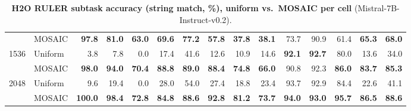 \begin{table}[tp]
\begin{tabular}{@{} c l rrrrrrrrrrrrr @{}}
     & MOSAIC & \textbf{97.8} & \textbf{81.0} & \textbf{63.0} & \textbf{69.6} & \textbf{77.2} & \textbf{57.8} & \textbf{37.8} & \textbf{38.1} & 73.7 & 90.9 & 61.4 & \textbf{65.3} & \textbf{68.0} \\
    \cmidrule(l){1-15}
    \multirow{2}{*}{1536} & Uniform & 3.8 & 7.8 & 0.0 & 17.4 & 41.6 & 12.6 & 10.9 & 14.6 & \textbf{92.1} & \textbf{92.7} & 80.0 & 13.6 & 34.0 \\
     & MOSAIC & \textbf{98.0} & \textbf{94.0} & \textbf{70.4} & \textbf{88.8} & \textbf{89.0} & \textbf{88.4} & \textbf{74.8} & \textbf{66.0} & 90.8 & 92.3 & \textbf{86.0} & \textbf{83.7} & \textbf{85.3} \\
    \cmidrule(l){1-15}
    \multirow{2}{*}{2048} & Uniform & 9.6 & 19.4 & 0.0 & 28.0 & 54.0 & 27.4 & 18.8 & 23.4 & 93.7 & 92.9 & 84.4 & 22.6 & 41.1 \\
     & MOSAIC & \textbf{100.0} & \textbf{98.4} & \textbf{72.8} & \textbf{84.8} & \textbf{88.6} & \textbf{92.8} & \textbf{81.2} & \textbf{73.7} & \textbf{94.0} & \textbf{93.0} & \textbf{95.7} & \textbf{86.5} & \textbf{88.6} \\
    \bottomrule
  \end{tabular}
  \caption{\textbf{H2O RULER subtask accuracy (string match, \%), uniform vs.\ MOSAIC per cell} (Mistral-7B-Instruct-v0.2).}
  \label{tab:app-ruler-mistral-h2o}
\end{table}

